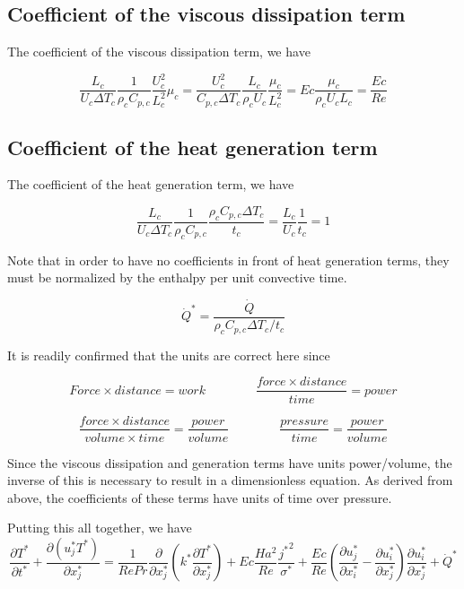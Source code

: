 \documentclass[11pt]{article}
\newcommand{\PD}{\partial}
\begin{document}
\subsection{Coefficient of the viscous dissipation term}
The coefficient of the viscous dissipation term, we have

\begin{equation}
\frac{L_c}{U_c \Delta T_c} \frac{1}{\rho_c C_{p,c}} \frac{U_c^2}{L_c^2}\mu_c =
\frac{U_c^2}{C_{p,c} \Delta T_c} \frac{L_c}{\rho_c U_c} \frac{\mu_c}{L_c^2} =
Ec \frac{\mu_c}{\rho_c U_c L_c} =
\frac{Ec}{Re}
\end{equation}

\subsection{Coefficient of the heat generation term}
The coefficient of the heat generation term, we have

\begin{equation}
	\frac{L_c}{U_c \Delta T_c} \frac{1}{\rho_c C_{p,c}} \frac{\rho_c C_{p,c} \Delta T_c}{t_c} =
	\frac{L_c}{U_c} \frac{1}{t_c} = 1
\end{equation}

Note that in order to have no coefficients in front of heat generation terms, they must be normalized by the enthalpy per unit convective time.

\begin{equation}
\dot{Q}^* = \frac{\dot{Q}}{\rho_c C_{p,c} \Delta T_c / t_c}
\end{equation}

It is readily confirmed that the units are correct here since 

\begin{equation}
Force \times distance = work \qquad \qquad
\frac{force \times distance}{time} = power
\end{equation}

\begin{equation}
\frac{force \times distance}{volume \times time} = \frac{power}{volume} \qquad \qquad
\frac{pressure}{time} = \frac{power}{volume}
\end{equation}

Since the viscous dissipation and generation terms have units power/volume, the inverse of this is necessary to result in a dimensionless equation. As derived from above, the coefficients of these terms have units of time over pressure.

Putting this all together, we have
\begin{equation}
	\frac{\PD T^*}{\PD t^*} + \frac{\PD (u_j^* T^*)}{\PD x_j^*}
	= 
	\frac{1}{Re Pr}
	\frac{\PD}{\PD x_j^*}
	\left( k^* \frac{\PD T^*}{\PD x_j^*} \right) + 
	Ec \frac{Ha^2}{Re}
	\frac{{j^*}^2}{\sigma^*} +
	\frac{Ec}{Re}
	\left( \frac{\PD u_j^*}{\PD x_i^*} - \frac{\PD u_i^*}{\PD x_j^*} \right)
	\frac{\PD u_i^*}{\PD x_j^*} +
	\dot{Q}^*
\end{equation}
\end{document}
